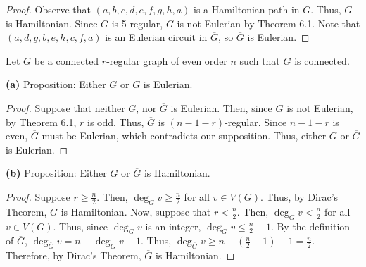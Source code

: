 \documentclass[12pt]{article}
\begin{document}
\begin{proof}
	Observe that $(a,b,c,d,e,f,g,h,a)$ is a Hamiltonian path in $G$.
	Thus, $G$ is Hamiltonian.
	Since $G$ is 5-regular, $G$ is not Eulerian by Theorem 6.1.
	Note that $(a,d,g,b,e,h,c,f,a)$ is an Eulerian circuit in $\overline G$, so $\overline G$ is Eulerian.

\end{proof}

\newpage{} Let $G$ be a connected $r$-regular graph of even order $n$ such that $\overline G$ is connected.

{\bf (a)} Proposition: Either $G$ or $\overline G$ is Eulerian.
\begin{proof}
	Suppose that neither $G$, nor $\overline G$ is Eulerian.
	Then, since $G$ is not Eulerian, by Theorem 6.1, $r$ is odd.
	Thus, $\overline G$ is $(n-1-r)$-regular.
	Since $n-1-r$ is even, $\overline G$ must be Eulerian, which contradicts our supposition.
	Thus, either $G$ or $\overline G$ is Eulerian.
\end{proof}

{\bf (b)} Proposition: Either $G$ or $\overline G$ is Hamiltonian.
\begin{proof}
	Suppose $r \geq \frac{n}{2}$.
	Then, $\deg_G v \geq \frac{n}{2}$ for all $v \in V(G)$.
	Thus, by Dirac's Theorem, $G$ is Hamiltonian.
	Now, suppose that $r < \frac{n}{2}$.
	Then, $\deg_G v < \frac{n}{2}$ for all $v \in V(G)$.
	Thus, since $\deg_G v$ is an integer, $\deg_G v \leq \frac n2 - 1$.
	By the definition of $\overline G$, $\deg_{\overline G}v = n - \deg_Gv-1$.
	Thus, $\deg_{\overline G}v \geq n - (\frac n2 - 1) - 1 = \frac n2$.
	Therefore, by Dirac's Theorem, $\overline{G}$ is Hamiltonian.
\end{proof}
\end{document}
